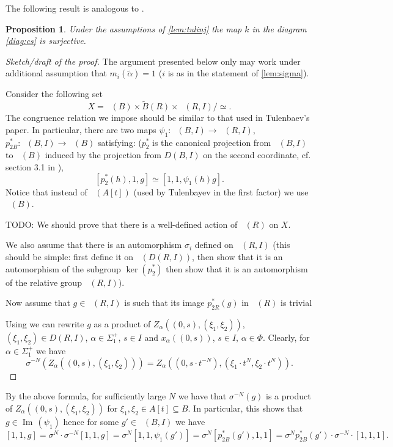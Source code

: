 \documentclass[oneside,12pt]{amsart}
\numberwithin{equation}{section}
\numberwithin{lem}{section}
\newtheorem{prop}[lem]{Proposition}
\theoremstyle{definition}
\theoremstyle{remark}
\DeclareMathOperator{\St}{St^G}
\DeclareMathOperator{\im}{Im\,}
\begin{document}
The following result is analogous to \cite[Proposition~4.1]{Tu}.
\begin{prop} \label{prop:kersurj} Under the assumptions of \cref{lem:tulinj} the map $k$ in the diagram \eqref{diag:cs} is surjective. \end{prop}
\begin{proof}[Sketch/draft of the proof]
The argument presented below only may work under additional assumption that $m_i(\widetilde{\alpha}) = 1$ ($i$ is as in the statement of \cref{lem:sigma}).

Consider the following set
$$X = \St(B) \times \widetilde{B}(R) \times \St(R, I) /  \simeq.$$
The congruence relation we impose should be similar to that used in Tulenbaev's paper.
In particular, there are two maps $\psi_1\colon\St(B, I) \to \St(R, I)$, $p_{2B}^* \colon \St(B, I) \to \St(B)$ satisfying:
($p_2^*$ is the canonical projection from $\St(B, I)$ to $\St(B)$ induced by the projection from $D(B, I)$ on the second coordinate, cf. section 3.1 in \cite{S15}),
$$[p_2^*(h), 1, g] \simeq [1, 1, \psi_1(h) g].$$
Notice that instead of $\St(A[t])$ (used by Tulenbayev in the first factor) we use $\St(B)$.

TODO: We should prove that there is a well-defined action of $\St(R)$ on $X$.

We also assume that there is an automorphism $\sigma_i$ defined on $\St(R, I)$ (this should be simple: first define it
on $\St(D(R, I))$, then show that it is an automorphism of the subgroup $\ker(p_2^*)$ 
then show that it is an automorphism of the relative group $\St(R, I)$).

Now assume that $g \in \St(R, I)$ is such that its image $p_{2R}^*(g)$ in $\St(R)$ is trivial 

Using \cite[Lemma~5]{S15} we can rewrite $g$ as a product of $Z_\alpha((0, s), (\xi_1, \xi_2))$, $(\xi_1,\xi_2)\in D(R, I)$, $\alpha\in\Sigma_1^+$, $s\in I$
and $x_\alpha((0, s))$, $s\in I$, $\alpha\in \Phi$.
Clearly, for $\alpha\in\Sigma_1^+$ we have 
$$\sigma^{-N}(Z_\alpha((0, s), (\xi_1, \xi_2))) = Z_\alpha((0, s\cdot t^{-N}), (\xi_1 \cdot t^N, \xi_2 \cdot t^N)).$$
\end{proof}
By the above formula, for sufficiently large $N$ we have that $\sigma^{-N}(g)$ is a product of $Z_\alpha((0, s), (\xi_1, \xi_2))$ for $\xi_1, \xi_2 \in A[t] \subseteq B$.
In particular, this shows that $g \in \im(\psi_1)$ hence for some $g' \in \St(B, I)$ we have
$$[1, 1, g] = \sigma^N \cdot \sigma^{-N} [1, 1, g] = \sigma^N [1, 1, \psi_1(g')] = \sigma^N [p_{2B}^*(g'), 1, 1] = \sigma^N p_{2B}^*(g')\cdot  \sigma^{-N} \cdot [1, 1, 1]. $$
\end{document}
